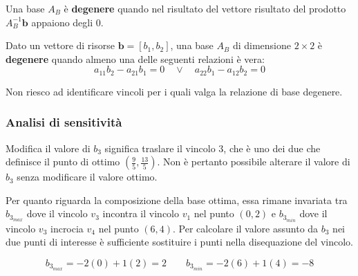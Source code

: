 \documentclass[\main/main.tex]{subfiles}
\begin{document}
\begin{definition}
  Una base $A_B$ è \textbf{degenere} quando nel risultato del vettore risultato del prodotto $A_B^{-1} \bm{b}$ appaiono degli 0.
\end{definition}

\begin{definition} \label{degenere_2_2}
  Dato un vettore di risorse $\bm{b} = [b_1, b_2]$, una base $A_B$ di dimensione  $2 \times 2$ è \textbf{degenere} quando almeno una delle seguenti relazioni è vera:
  \[
    a_{11}b_2 - a_{21}b_1 = 0 \quad \lor \quad a_{22}b_1 - a_{12}b_2 = 0
  \]
\end{definition}

Non riesco ad identificare vincoli per i quali valga la relazione di base degenere.

\subsubsection*{Analisi di sensitività}
Modifica il valore di $b_3$ significa traslare il vincolo $3$, che è uno dei due che definisce il punto di ottimo $(\frac{9}{5}, \frac{13}{5})$. Non è pertanto possibile alterare il valore di $b_3$ senza modificare il valore ottimo.

Per quanto riguarda la composizione della base ottima, essa rimane invariata tra $b_{3_{max}}$ dove il vincolo $v_3$ incontra il vincolo $v_1$ nel punto $(0,2)$ e $b_{3_{min}}$ dove il vincolo $v_3$ incrocia $v_4$ nel punto $(6,4)$. Per calcolare il valore assunto da $b_3$ nei due punti di interesse è sufficiente sostituire i punti nella disequazione del vincolo.

\[
  b_{3_{max}} = -2(0) + 1(2) = 2 \qquad b_{3_{min}} = -2(6) + 1(4) = -8
\]
\end{document}
